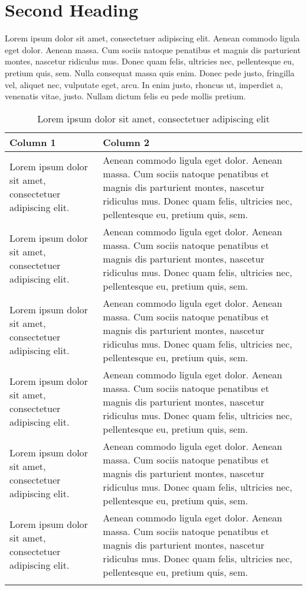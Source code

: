 \documentclass[11pt,a4paper]{scrreprt}
\begin{document}
\section{Second Heading} \label{sec:second-heading}

Lorem ipsum dolor sit amet, consectetuer adipiscing elit. Aenean commodo ligula eget dolor. Aenean massa. Cum sociis natoque penatibus et magnis dis parturient montes, nascetur ridiculus mus. Donec quam felis, ultricies nec, pellentesque eu, pretium quis, sem. Nulla consequat massa quis enim. Donec pede justo, fringilla vel, aliquet nec, vulputate eget, arcu. In enim justo, rhoncus ut, imperdiet a, venenatis vitae, justo. Nullam dictum felis eu pede mollis pretium.

\FloatBarrier
\begin{longtable}{P{0.3\textwidth}P{0.65\textwidth}}
    \toprule
    \textbf{Column 1} & \textbf{Column 2} \\
    \midrule
    Lorem ipsum dolor sit amet, consectetuer adipiscing elit. & Aenean commodo ligula eget dolor. Aenean massa. Cum sociis natoque penatibus et magnis dis parturient montes, nascetur ridiculus mus. Donec quam felis, ultricies nec, pellentesque eu, pretium quis, sem. \\
    \midrule
    Lorem ipsum dolor sit amet, consectetuer adipiscing elit. & Aenean commodo ligula eget dolor. Aenean massa. Cum sociis natoque penatibus et magnis dis parturient montes, nascetur ridiculus mus. Donec quam felis, ultricies nec, pellentesque eu, pretium quis, sem. \\
    \midrule
    Lorem ipsum dolor sit amet, consectetuer adipiscing elit. & Aenean commodo ligula eget dolor. Aenean massa. Cum sociis natoque penatibus et magnis dis parturient montes, nascetur ridiculus mus. Donec quam felis, ultricies nec, pellentesque eu, pretium quis, sem. \\
    \midrule
    Lorem ipsum dolor sit amet, consectetuer adipiscing elit. & Aenean commodo ligula eget dolor. Aenean massa. Cum sociis natoque penatibus et magnis dis parturient montes, nascetur ridiculus mus. Donec quam felis, ultricies nec, pellentesque eu, pretium quis, sem. \\
    \midrule
    Lorem ipsum dolor sit amet, consectetuer adipiscing elit. & Aenean commodo ligula eget dolor. Aenean massa. Cum sociis natoque penatibus et magnis dis parturient montes, nascetur ridiculus mus. Donec quam felis, ultricies nec, pellentesque eu, pretium quis, sem. \\
    \midrule
    Lorem ipsum dolor sit amet, consectetuer adipiscing elit. & Aenean commodo ligula eget dolor. Aenean massa. Cum sociis natoque penatibus et magnis dis parturient montes, nascetur ridiculus mus. Donec quam felis, ultricies nec, pellentesque eu, pretium quis, sem. \\
    \bottomrule
    \caption{Lorem ipsum dolor sit amet, consectetuer adipiscing elit}
    \label{table:table-lable}
\end{longtable}
\FloatBarrier
\end{document}
